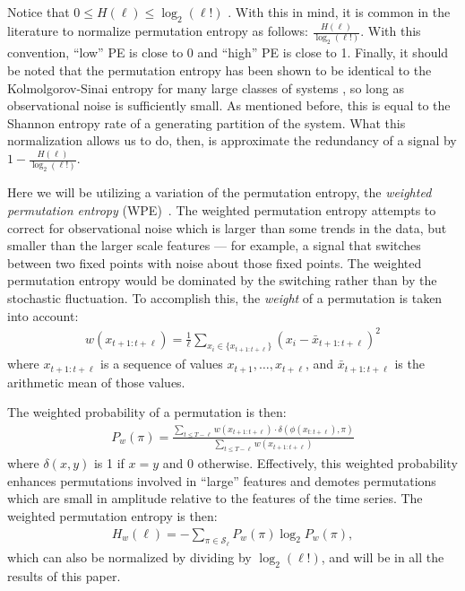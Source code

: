Notice that $0\le H(\ell) \le \log_2(\ell!)$ \cite{bandt2002per}.  With this in mind, it is common in the literature to normalize permutation entropy as follows: $\frac{H(\ell)}{\log_2(\ell!)}$.  With this convention, ``low'' PE is close to 0 and ``high'' PE is close to 1. Finally, it should be noted that the permutation entropy has been shown to be identical to the Kolmolgorov-Sinai entropy for many large classes of systems \cite{amigo2012permutation}, so long as observational noise is sufficiently small. As mentioned before, this is equal to the Shannon entropy rate of a generating partition of the system. What this normalization allows us to do, then, is approximate the redundancy of a signal by $1 - \frac{H(\ell)}{\log_2(\ell!)}$.

Here we will be utilizing a variation of the permutation entropy, the \emph{weighted permutation entropy} (WPE)~\cite{fadlallah2013}. The weighted permutation entropy attempts to correct for observational noise which is larger than some trends in the data, but smaller than the larger scale features --- for example, a signal that switches between two fixed points with noise about those fixed points. The weighted permutation entropy would be dominated by the switching rather than by the stochastic fluctuation. To accomplish this, the \emph{weight} of a permutation is taken into account:
\begin{align*}
  w(x_{t+1:t+\ell}) = \frac{1}{\ell} \sum_{x_i \in \{x_{t+1:t+\ell}\}}
                      \left( x_i - \bar{x}_{t+1:t+\ell} \right)^2
\end{align*}
where $x_{t+1:t+\ell}$ is a sequence of values $x_{t+1}, \ldots, x_{t+\ell}$, and $\bar{x}_{t+1:t+\ell}$ is the arithmetic mean of those values.

The weighted probability of a permutation is then:
\begin{align*}
  P_w(\pi) = \frac{\displaystyle \sum_{t \le T - \ell} w(x_{t+1:t+\ell}) \cdot \delta(\phi(x_{t:t+\ell}), \pi) }{\displaystyle \sum_{t \le T - \ell} w(x_{t+1:t+\ell})}
\end{align*}
where $\delta(x, y)$ is 1 if $x = y$ and 0 otherwise. Effectively, this weighted probability enhances permutations involved in ``large'' features and demotes permutations which are small in amplitude relative to the features of the time series. The weighted permutation entropy is then:
\begin{align*}
  H_w(\ell) = - \sum_{\pi \in \mathcal{S}_\ell} P_w(\pi) \log_2 P_w(\pi),
\end{align*}
which can also be normalized by dividing by $\log_2(\ell!)$, and will be in all the results of this paper.

